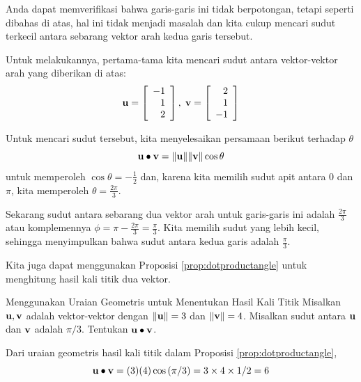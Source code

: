 \begin{solution}
Anda dapat memverifikasi bahwa garis-garis ini tidak berpotongan, tetapi seperti dibahas
di atas, hal ini tidak menjadi masalah dan kita cukup mencari sudut terkecil
antara sebarang vektor arah kedua garis tersebut.

Untuk melakukannya, pertama-tama kita mencari sudut
antara vektor-vektor arah yang diberikan di atas:
\begin{equation*}
\mathbf{u}=\left[
\begin{array}{r}
-1 \\
1 \\
2
\end{array}
\right],\;
\mathbf{v}=\left[
\begin{array}{r}
2 \\
1 \\
-1
\end{array}
\right]
\end{equation*}

Untuk mencari sudut tersebut, kita menyelesaikan persamaan berikut terhadap $\theta$
\begin{equation*}
\mathbf{u}\bullet \mathbf{v}=\| \mathbf{u}\| \| \mathbf{v}
\| \cos \theta
\end{equation*}
untuk memperoleh $\cos \theta = -\frac{1}{2}$ dan, karena kita memilih sudut apit
antara $0$ dan $\pi$, kita memperoleh $\theta = \frac{2 \pi}{3}$.

Sekarang sudut antara sebarang dua vektor arah untuk garis-garis ini
adalah $\frac{2 \pi}{3}$ atau komplemennya $ \phi = \pi -  \frac{2 \pi}{3}
= \frac{\pi}{3}$. Kita memilih sudut yang lebih kecil, sehingga menyimpulkan bahwa sudut antara kedua garis adalah $\frac{\pi}{3}$.
\end{solution}

Kita juga dapat menggunakan Proposisi \ref{prop:dotproductangle} untuk menghitung hasil kali titik dua vektor.

\begin{example}{Menggunakan Uraian Geometris untuk Menentukan Hasil Kali Titik}\label{exa:geometricdotproduct}
Misalkan $\mathbf{u},\mathbf{v}$ adalah vektor-vektor dengan $ \| \mathbf{u} \| = 3$ dan $\| \mathbf{v} \| = 4$.
Misalkan sudut antara $\mathbf{u}$ dan $\mathbf{v}$ adalah $\pi / 3$. Tentukan $\mathbf{u}\bullet \mathbf{v}$.
\end{example}

\begin{solution}
Dari uraian geometris hasil kali titik dalam Proposisi \ref{prop:dotproductangle},
\begin{equation*}
\mathbf{u}\bullet \mathbf{v}=(3)(4) \cos \left( \pi / 3\right) =3\times
4\times 1/2=6
\end{equation*}
\end{solution}

